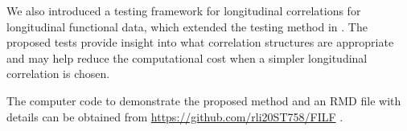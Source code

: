 \documentclass[submit]{smj}
\begin{document}
We also introduced a testing framework for longitudinal correlations for longitudinal functional data, which extended the testing method in \cite{Chen2019}. The proposed tests provide insight into what correlation structures are appropriate and may help reduce the computational cost  when a simpler longitudinal correlation is chosen.

The computer code to demonstrate the proposed method and an RMD file with details can be obtained from \url{https://github.com/rli20ST758/FILF} .




\end{document}
